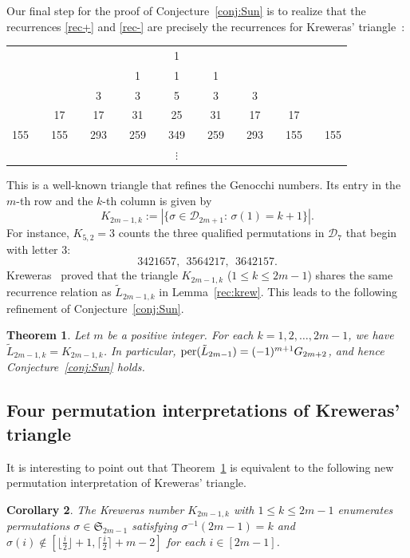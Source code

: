 \documentclass[11pt,reqno]{amsart}
\numberwithin{equation}{section}
\theoremstyle{plain}
\newtheorem{theorem}{Theorem}[section]
\newtheorem{corollary}[theorem]{Corollary}
\theoremstyle{definition}
\renewcommand{\S}{\mathfrak{S}}
\def\per{\mathrm{per}}
\def\per{{\rm per}}
\begin{document}
Our final step for the proof of Conjecture~\ref{conj:Sun} is to realize that the recurrences \eqref{rec+} and \eqref{rec-}  are precisely the recurrences for Kreweras' triangle~\cite{Kre}:
\begin{center}
\begin{tabular}{ccccccccccccccccc}
 & & & &  & &  & & 1 & &  & & & & & & \\
 & & & &  & & 1 & & 1 & & 1 & & & & & & \\
 & & & & 3 & & 3 & & 5 & & 3 & & 3 & & & & \\
 & & 17 & & 17 & & 31 & & 25 & & 31 & & 17 & & 17 & & \\
155 & & 155 & & 293 & & 259 & & 349 & & 259 & & 293 & & 155 & & 155 \\
 & & & &  & &  & & $\vdots$ & &  & & & & & &
\end{tabular}
\end{center}
This is a well-known triangle that refines the Genocchi numbers.
Its entry in the $m$-th row and the $k$-th column is given by
$$K_{2m-1,k}:=
|\{\sigma\in\mathcal{D}_{2m+1}:\, \sigma(1)=k+1\}|.
$$
For instance, $K_{5,2}=3$ counts the three qualified permutations in $\mathcal{D}_7$ that begin with letter $3$:
$$3421657,\ \ 3564217,\ \ 3642157.$$
Kreweras~\cite{Kre} proved that the triangle $K_{2m-1,k}$ ($1\leq k\leq 2m-1$)
shares the same recurrence relation as $\tilde{L}_{2m-1,k}$ in Lemma~\ref{rec:krew}. This leads to the following refinement of Conjecture~\ref{conj:Sun}.

\begin{theorem}\label{per:krew} Let $m$ be a positive integer. For each
$k=1,2,\ldots, 2m-1$, we have $\tilde{L}_{2m-1,k}=K_{2m-1,k}$. In particular, $\per(\tilde{L}_{2m-1})=(-1)^{m+1}G_{2m+2}$, and hence Conjecture~\ref{conj:Sun} holds.
\end{theorem}

\subsection{Four permutation interpretations of Kreweras' triangle}

  It is interesting to point out that Theorem~\ref{per:krew} is equivalent to the following new permutation interpretation of Kreweras' triangle.

\begin{corollary}
The Kreweras number  $K_{2m-1,k}$ with $1\le k\le 2m-1$ enumerates permutations $\sigma\in\S_{2m-1}$ satisfying $\sigma^{-1}(2m-1)=k$ and $\sigma(i)\notin[\lfloor\frac{i}{2}\rfloor+1, \lceil\frac{i}{2}\rceil+m-2]$ for each $i\in[2m-1]$.
\end{corollary}
\end{document}
